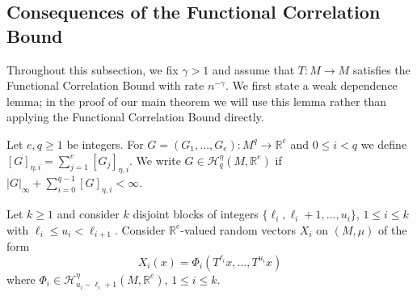 \documentclass[11pt,a4paper,reqno,oneside]{amsart}
\newcommand{\R}{\ensuremath{\mathbb{R}}}%
\newcommand{\norminf}[1]{\left|#1\right|_\infty}
\newcommand{\tf}{T}
\newcommand{\ms}{M}
\newcommand{\sepdholsp}[1]{\mathcal{H}^\eta_{#1}}
\theoremstyle{definition}
\theoremstyle{remark}
\numberwithin{equation}{section}
\begin{document}
	\subsection{Consequences of the Functional Correlation Bound}
	Throughout this subsection, we fix $\gamma>1$ and
	assume that $T:M\to M$ satisfies the Functional Correlation Bound with rate $n^{-\gamma}$. We first state a weak dependence lemma; in the proof of our main theorem we will use this lemma rather than applying the Functional Correlation Bound directly.
	
	Let $ e,q\ge 1 $ be integers. For $ G=(G_1,\dots,G_e):M^q\to \R^e $ and $ 0\le i<q $ we define $ [G]_{\eta,i}=\sum_{j=1}^e [G_j]_{\eta,i} $. We write $ G\in \sepdholsp{q}(M,\R^e) $ if $ \norminf{G}+\sum_{i=0}^{q-1}[G]_{\eta,i}<\infty $.
	
	Let $k\ge 1$ and consider $ k $ disjoint blocks of integers $\{\ell_i,\ell_i+1,\dots,u_i\}$, $1\le i\le k$ with $ \ell_i\le u_i<\ell_{i+1}. $ Consider $ \R^e $-valued random vectors $ X_i $ on $ (\ms,\mu) $ of the form
	\begin{equation*}
		X_i(x)=\varPhi_i(\tf^{\ell_i}x,\dots,\tf^{u_i}x)
	\end{equation*}
	where $ \varPhi_i\in \sepdholsp{u_i-\ell_i+1}(\ms,\R^e) $, $ 1\le i\le k. $
	
\end{document}
